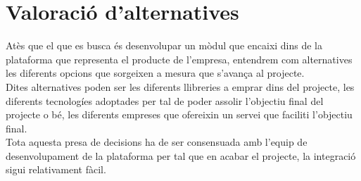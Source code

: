 \section{Valoració d'alternatives}
Atès que el que es busca és desenvolupar un mòdul que encaixi dins de la plataforma que representa el producte de l'empresa, entendrem com alternatives les diferents opcions que sorgeixen a mesura que s'avança al projecte.\\
\newline Dites alternatives poden ser les diferents llibreries a emprar dins del projecte, les diferents tecnologíes adoptades per tal de poder assolir l'objectiu final del projecte o bé, les diferents empreses que ofereixin un servei que faciliti l'objectiu final.\\
\newline Tota aquesta presa de decisions ha de ser consensuada amb l'equip de desenvolupament de la plataforma per tal que en acabar el projecte, la integració sigui relativament fàcil.
